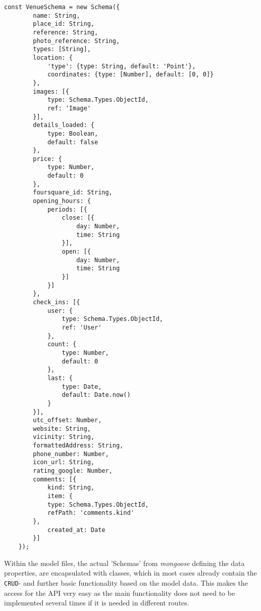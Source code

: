 \begin{lstlisting}[caption={Example of a \textit{mongoose} 'Schema'. The model for a venue is shown, which contains some properties which are fetched by the \textit{Google Places API} like the \texttt{opening\_hours} or the \texttt{place\_id}. On top, own properties like the ckeck-ins or text or image comments of users are added.}, label=lst:model]
	const VenueSchema = new Schema({
		name: String,
		place_id: String,
		reference: String,
		photo_reference: String,
		types: [String],
		location: {
			'type': {type: String, default: 'Point'},
			coordinates: {type: [Number], default: [0, 0]}
		},
		images: [{
			type: Schema.Types.ObjectId,
			ref: 'Image'
		}],
		details_loaded: {
			type: Boolean,
			default: false
		},
		price: {
			type: Number,
			default: 0
		},
		foursquare_id: String,
		opening_hours: {
			periods: [{
				close: [{
					day: Number,
					time: String
				}],
				open: [{
					day: Number,
					time: String
				}]
			}]
		},
		check_ins: [{
			user: {
				type: Schema.Types.ObjectId,
				ref: 'User'
			},
			count: {
				type: Number,
				default: 0
			},
			last: {
				type: Date,
				default: Date.now()
			}
		}],
		utc_offset: Number,
		website: String,
		vicinity: String,
		formattedAddress: String,
		phone_number: Number,
		icon_url: String,
		rating_google: Number,
		comments: [{
			kind: String,
			item: {
			type: Schema.Types.ObjectId,
			refPath: 'comments.kind'
		},
			created_at: Date
		}]
	});
\end{lstlisting}

Within the model files, the actual 'Schemas' from \textit{mongoose} defining the data properties, are encapsulated with classes, which in most cases already contain the \texttt{CRUD}- and further basic functionality based on the model data. This makes the access for the API very easy as the main functionality does not need to be implemented several times if it is needed in different routes. 

